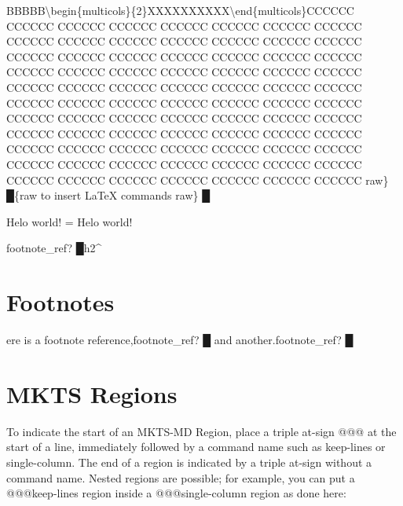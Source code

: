 BBBBB\textbackslash{}begin\{multicols\}\{2\}XXXXXXXXXX\textbackslash{}end\{multicols\}CCCCCC CCCCCC CCCCCC CCCCCC CCCCCC CCCCCC CCCCCC CCCCCC CCCCCC CCCCCC
CCCCCC CCCCCC CCCCCC CCCCCC CCCCCC CCCCCC CCCCCC CCCCCC CCCCCC CCCCCC CCCCCC CCCCCC CCCCCC CCCCCC CCCCCC CCCCCC CCCCCC
CCCCCC CCCCCC CCCCCC CCCCCC CCCCCC CCCCCC CCCCCC CCCCCC CCCCCC CCCCCC CCCCCC CCCCCC CCCCCC CCCCCC CCCCCC CCCCCC CCCCCC
CCCCCC CCCCCC CCCCCC CCCCCC CCCCCC CCCCCC CCCCCC CCCCCC CCCCCC CCCCCC CCCCCC CCCCCC CCCCCC CCCCCC CCCCCC CCCCCC CCCCCC
CCCCCC CCCCCC CCCCCC CCCCCC CCCCCC CCCCCC CCCCCC CCCCCC CCCCCC CCCCCC CCCCCC CCCCCC CCCCCC CCCCCC CCCCCC CCCCCC CCCCCC
{\mktsStyleBold\color{violet}{\mktsStyleSymbol}raw\} {\mktsStyleSymbol█}}{\mktsStyleBold\color{violet}{\mktsStyleSymbol█}\{raw {\mktsStyleSymbol}}to insert \LaTeX{}
 commands
{\mktsStyleBold\color{violet}{\mktsStyleSymbol}raw\} {\mktsStyleSymbol█}}
\mktsShowpar\par
\begin{multicols}{2}
\end{multicols}Helo {\mktsStyleCode{}world}! = Helo {\mktsStyleCode{}world}!\mktsShowpar\par
\begin{multicols}{2}{\mktsStyleBold\color{violet}{\mktsStyleSymbol}footnote\_ref? {\mktsStyleSymbol█}}h2\textasciicircum{}\mktsShowpar\par
\end{multicols}
\section{Footnotes
}
\begin{multicols}{2}ere is a footnote reference,{\mktsStyleBold\color{violet}{\mktsStyleSymbol}footnote\_ref? {\mktsStyleSymbol█}} and another.{\mktsStyleBold\color{violet}{\mktsStyleSymbol}footnote\_ref? {\mktsStyleSymbol█}}\mktsShowpar\par
\end{multicols}
\section{MKTS Regions 
}
\begin{multicols}{2}To indicate the start of an MKTS-MD Region, place a triple at-sign {\mktsStyleCode{}@@@}
at the start of a line, immediately followed by a command name such as
{\mktsStyleCode{}keep-lines} or {\mktsStyleCode{}single-column}. The end of a region is indicated by a
triple at-sign without a command name. Nested regions are possible; for example,
you can put a {\mktsStyleCode{}@@@keep-lines} region inside a {\mktsStyleCode{}@@@single-column} region as
done here:\mktsShowpar\par
\end{multicols}
